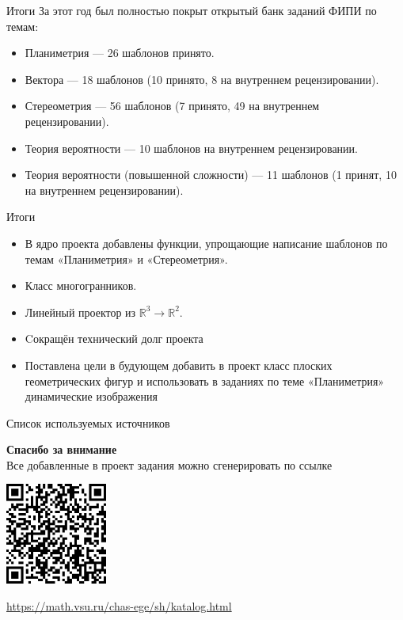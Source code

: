 \documentclass[aspectratio=169,12pt]{beamer}
\begin{document}
\begin{frame}{Итоги}
	За этот год был полностью покрыт открытый банк заданий ФИПИ по темам:
	\begin{itemize}
		\item Планиметрия — 26 шаблонов принято.
		\item Вектора — 18 шаблонов (10 принято, 8 на внутреннем рецензировании).
		\item Стереометрия — 56 шаблонов (7 принято, 49 на внутреннем рецензировании).
		\item Теория вероятности — 10 шаблонов на внутреннем рецензировании.
		\item Теория вероятности (повышенной сложности) — 11 шаблонов (1 принят, 10 на внутреннем рецензировании).
	\end{itemize}

\end{frame}

\begin{frame}{Итоги}
	
	\begin{itemize}
		\item В ядро проекта добавлены функции, упрощающие написание шаблонов по темам «Планиметрия» и  «Стереометрия».
		\item Класс многогранников.
		\item Линейный проектор из $\mathbb{R}^3 \to \mathbb{R}^2$.
	\end{itemize}

	\begin{itemize}
		\item Cокращён технический долг проекта
		\item Поставлена цели в будующем добавить в проект класс плоских геометрических фигур и использовать в заданиях по теме «Планиметрия» динамические изображения
	\end{itemize}
\end{frame}

\begin{frame}{Список используемых источников}
	
\end{frame}

\begin{frame}
	\center\large\textcolor{NordBrightBlue}{\textbf{Спасибо за внимание}}\\
	\hfill \break
	\normalsize
	Все добавленные в проект задания можно сгенерировать по ссылке\\
	\hfill \break

	\includegraphics[width=0.25\textwidth]{QR-code}\\
	\hfill \break

	\url{https://math.vsu.ru/chas-ege/sh/katalog.html}
\end{frame}
\end{document}
